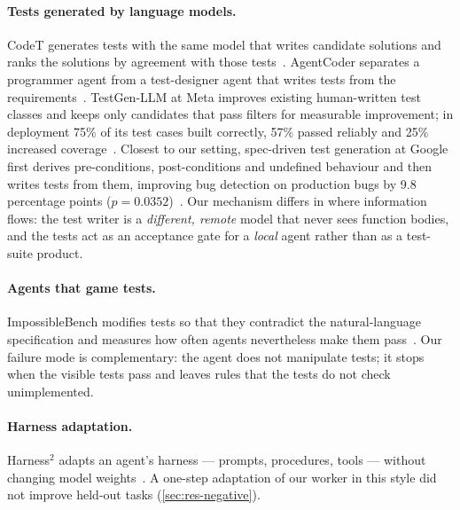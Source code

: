 \documentclass[11pt]{article}
\begin{document}
\paragraph{Tests generated by language models.} CodeT generates tests with the same model that writes candidate solutions and ranks the solutions by agreement with those tests~\citep{chen2023codet}. AgentCoder separates a programmer agent from a test-designer agent that writes tests from the requirements~\citep{huang2024agentcoder}. TestGen-LLM at Meta improves existing human-written test classes and keeps only candidates that pass filters for measurable improvement; in deployment 75\% of its test cases built correctly, 57\% passed reliably and 25\% increased coverage~\citep{alshahwan2024testgen}. Closest to our setting, spec-driven test generation at Google first derives pre-conditions, post-conditions and undefined behaviour and then writes tests from them, improving bug detection on production bugs by 9.8 percentage points ($p=0.0352$)~\citep{tufano2026contracts}. Our mechanism differs in where information flows: the test writer is a \emph{different, remote} model that never sees function bodies, and the tests act as an acceptance gate for a \emph{local} agent rather than as a test-suite product.

\paragraph{Agents that game tests.} ImpossibleBench modifies tests so that they contradict the natural-language specification and measures how often agents nevertheless make them pass~\citep{zhong2026impossiblebench}. Our failure mode is complementary: the agent does not manipulate tests; it stops when the visible tests pass and leaves rules that the tests do not check unimplemented.

\paragraph{Harness adaptation.} Harness$^2$ adapts an agent's harness --- prompts, procedures, tools --- without changing model weights~\citep{harness2}. A one-step adaptation of our worker in this style did not improve held-out tasks (\cref{sec:res-negative}).
\end{document}
